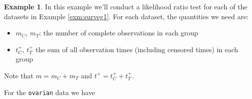 \documentclass[
  openany]{book}
\newenvironment{Shaded}{\begin{snugshade}}{\end{snugshade}}
\newcommand{\DecValTok}[1]{\textcolor[rgb]{0.00,0.00,0.81}{#1}}
\newcommand{\DocumentationTok}[1]{\textcolor[rgb]{0.56,0.35,0.01}{\textbf{\textit{#1}}}}
\newcommand{\FunctionTok}[1]{\textcolor[rgb]{0.13,0.29,0.53}{\textbf{#1}}}
\newcommand{\NormalTok}[1]{#1}
\newcommand{\OtherTok}[1]{\textcolor[rgb]{0.56,0.35,0.01}{#1}}
\newcommand{\SpecialCharTok}[1]{\textcolor[rgb]{0.81,0.36,0.00}{\textbf{#1}}}
\providecommand{\tightlist}{%
  \setlength{\itemsep}{0pt}\setlength{\parskip}{0pt}}
\theoremstyle{definition}
\theoremstyle{definition}
\newtheorem{example}{Example}[chapter]
\theoremstyle{definition}
\theoremstyle{definition}
\theoremstyle{remark}
\begin{document}
\begin{example}
\protect\hypertarget{exm:surveglr}{}\label{exm:surveglr}In this example we'll conduct a likelihood ratio test for each of the datasets in Example \ref{exm:surveg1}. For each dataset, the quantities we need are:

\begin{itemize}
\tightlist
\item
  \(m_C,\,m_T\): the number of complete observations in each group
\item
  \(t^+_C,\,t^+_T\) the sum of all observation times (including censored times) in each group
\end{itemize}

Note that \(m=m_C + m_T\) and \(t^+ = t^+_C + t^+_T\).

For the \texttt{ovarian} data we have

\begin{Shaded}
\end{Shaded}


\end{example}
\end{document}
